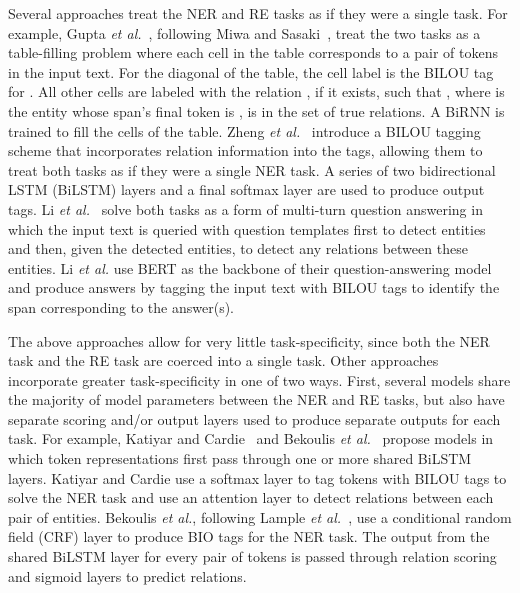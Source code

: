 \documentclass{article}
\begin{document}
Several approaches treat the NER and RE tasks as if they were a single task. For example, Gupta {\em et al.}~, following Miwa and Sasaki~, treat the two tasks as a table-filling problem where each cell in the table corresponds to a pair of tokens  in the input text. For the diagonal of the table, the cell label is the BILOU tag for . All other cells are labeled with the relation , if it exists, such that , where  is the entity whose span's final token is , is in the set of true relations. A BiRNN is trained to fill the cells of the table. Zheng {\em et al.}~ introduce a BILOU tagging scheme that incorporates relation information into the tags, allowing them to treat both tasks as if they were a single NER task. A series of two bidirectional LSTM (BiLSTM) layers and a final softmax layer are used to produce output tags. Li {\em et al.}~ solve both tasks as a form of multi-turn question answering in which the input text is queried with question templates first to detect entities and then, given the detected entities, to detect any relations between these entities. Li {\em et al.} use BERT \cite{devlin-etal-2019-bert} as the backbone of their question-answering model and produce answers by tagging the input text with BILOU tags to identify the span corresponding to the answer(s).

The above approaches allow for very little task-specificity, since both the NER task and the RE task are coerced into a single task. Other approaches incorporate greater task-specificity in one of two ways. First, several models share the majority of model parameters between the NER and RE tasks, but also have separate scoring and/or output layers used to produce separate outputs for each task. For example, Katiyar and Cardie~ and Bekoulis {\em et al.}~ propose models in which token representations first pass through one or more shared BiLSTM layers. Katiyar and Cardie use a softmax layer to tag tokens with BILOU tags to solve the NER task and use an attention layer to detect relations between each pair of entities. Bekoulis {\em et al.}, following Lample {\em et al.}~, use a conditional random field (CRF) layer to produce BIO tags for the NER task. The output from the shared BiLSTM layer for every pair of tokens is passed through relation scoring and sigmoid layers to predict relations. 
\end{document}
